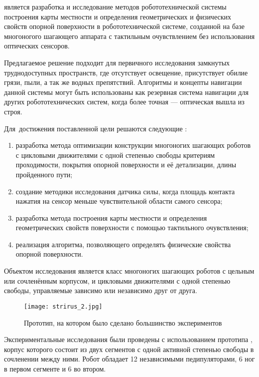 {\aim} является разработка и исследование методов робототехнической системы построения карты местности и определения геометрических и физических свойств опорной поверхности в робототехнической системе, созданной на  базе многоногого шагающего аппарата с тактильным очувствлением без использования оптических сенсоров.

Предлагаемое решение подходит для первичного исследования замкнутых труднодоступных пространств, где отсутствует освещение, присутствует обилие грязи, пыли, а так же водных препятствий. Алгоритмы и концепты навигации данной системы могут быть использованы как резервная система навигации для других робототехнических систем, когда более точная --- оптическая вышла из строя.

Для~достижения поставленной цели решаются следующие {\tasks}:
\begin{enumerate}[beginpenalty=10000] %
    \item разработка метода оптимизации конструкции многоногих шагающих роботов с цикловыми движителями с одной степенью свободы критериям проходимости, покрытия опорной поверхности и её детализации, длины пройденного пути;
    \item создание методики исследования датчика силы, когда площадь контакта нажатия на сенсор меньше чувствительной области самого сенсора;
  \item  разработка метода построения карты местности и определения геометрических свойств поверхности с помощью тактильного очувствления;
  \item реализация алгоритма, позволяющего определять физические свойства опорной поверхности.
\end{enumerate}

{\researchobj}
Объектом исследования является класс многоногих шагающих роботов с цельным или сочленённым корпусом, и цикловыми движителями с одной степенью свободы, управляемые зависимо или независимо друг от друга.

\begin{figure}[H]
  \centering\texttt{[image: strirus\_2.jpg]}
  \caption{Прототип, на котором было сделано большинство экспериментов}
  \label{fig:strirus_2.jpgg}
\end{figure}

Экспериментальные исследования были проведены с использованием прототипа , корпус которого состоит из двух сегментов с одной активной степенью свободы в сочленении между ними. Робот обладает 12 независимыми педипуляторами, 6 ног в первом сегменте и 6 во втором.

